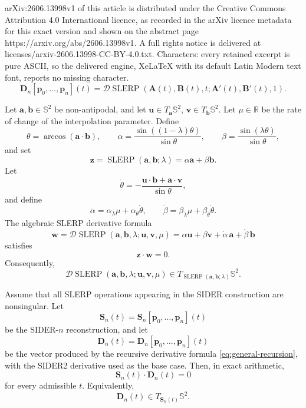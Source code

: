 \documentclass[10pt,a4paper]{amsart}
\newcommand{\bA}{\mathbf{A}}
\newcommand{\bB}{\mathbf{B}}
\newcommand{\bD}{\mathbf{D}}
\newcommand{\ba}{\mathbf{a}}
\newcommand{\bb}{\mathbf{b}}
\newcommand{\bp}{\mathbf{p}}
\newcommand{\bu}{\mathbf{u}}
\newcommand{\bv}{\mathbf{v}}
\newcommand{\bw}{\mathbf{w}}
\newcommand{\bz}{\mathbf{z}}
\newcommand{\slerp}{\operatorname{SLERP}}
\begin{document}
arXiv:2606.13998v1 of this article is distributed under the Creative Commons Attribution 4.0 International licence, as recorded in the arXiv licence metadata for this exact version and shown on the abstract page https://arxiv.org/abs/2606.13998v1. A full rights notice is delivered at licenses/arxiv-2606.13998-CC-BY-4.0.txt. Characters: every retained excerpt is pure ASCII, so the delivered engine, XeLaTeX with its default Latin Modern text font, reports no missing character.
\begin{equation}
\label{eq:general-recursion}
\boxed{
        \bD_n[\bp_0,\ldots,\bp_n](t)
        =
        \mathcal{D}\slerp
        \left(
        \bA(t),\bB(t),t;
        \bA'(t),\bB'(t),1
        \right).
}
\end{equation}

\begin{lemma}\label{lem:slerp-formula-tangent}
Let \(\ba,\bb\in\mathbb{S}^2\) be non-antipodal, and let \(\bu\in T_{\ba}\mathbb{S}^2\), \(\bv\in T_{\bb}\mathbb{S}^2\).  Let \(\mu\in\mathbb{R}\) be the rate of change of the interpolation parameter.  Define
\[
        \theta=\arccos(\ba\cdot\bb),\qquad
        \alpha=\frac{\sin((1-\lambda)\theta)}{\sin\theta},
        \qquad
        \beta=\frac{\sin(\lambda\theta)}{\sin\theta},
\]
and set
\[
        \bz=\slerp(\ba,\bb;\lambda)=\alpha\ba+\beta\bb .
\]
Let
\[
        \dot\theta
        =
        -\frac{\bu\cdot\bb+\ba\cdot\bv}{\sin\theta},
\]
and define
\[
        \dot\alpha=\alpha_\lambda \mu+\alpha_\theta\dot\theta,
        \qquad
        \dot\beta=\beta_\lambda \mu+\beta_\theta\dot\theta .
\]
The algebraic SLERP derivative formula
\[
        \bw
        =
        \mathcal{D}\slerp(\ba,\bb,\lambda;\bu,\bv,\mu)
        =
        \alpha\bu+\beta\bv+\dot\alpha\,\ba+\dot\beta\,\bb
\]
satisfies
\[
        \bz\cdot\bw=0 .
\]
Consequently,
\[
        \mathcal{D}\slerp(\ba,\bb,\lambda;\bu,\bv,\mu)
        \in T_{\slerp(\ba,\bb;\lambda)}\mathbb{S}^2 .
\]
\end{lemma}

\begin{prop}\label{prop:sider-formula-tangent}
Assume that all SLERP operations appearing in the SIDER construction are nonsingular.  Let
\[
        \mathbf{S}_n(t)=\mathbf{S}_n[\bp_0,\ldots,\bp_n](t)
\]
be the SIDER-\(n\) reconstruction, and let
\[
        \bD_n(t)=\bD_n[\bp_0,\ldots,\bp_n](t)
\]
be the vector produced by the recursive derivative formula \eqref{eq:general-recursion}, with the SIDER2 derivative used as the base case.  Then, in exact arithmetic,
\[
        \mathbf{S}_n(t)\cdot\bD_n(t)=0
\]
for every admissible \(t\).  Equivalently,
\[
        \bD_n(t)\in T_{\mathbf{S}_n(t)}\mathbb{S}^2 .
\]
\end{prop}
\end{document}
